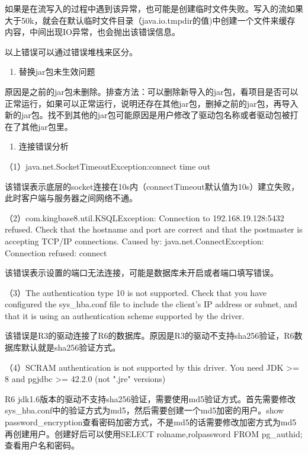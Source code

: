 \documentclass[letterpaper,10pt,english]{sphinxmanual}
\begin{document}
如果是在流写入的过程中遇到该异常，也可能是创建临时文件失败。写入的流如果大于50k，就会在默认临时文件目录（java.io.tmpdir的值)中创建一个文件来缓存内容，中间出现IO异常，也会抛出该错误信息。

以上错误可以通过错误堆栈来区分。
\begin{enumerate}
%
\setcounter{enumi}{5}
\item {} 
替换jar包未生效问题

\end{enumerate}

原因是之前的jar包未删除。排查方法：可以删除新导入的jar包，看项目是否可以正常运行，如果可以正常运行，说明还存在其他jar包，删掉之前的jar包，再导入新的jar包。找不到其他的jar包可能原因是用户修改了驱动包名称或者驱动包被打在了其他jar包里。
\begin{enumerate}
%
\setcounter{enumi}{6}
\item {} 
连接错误分析

\end{enumerate}

（1）java.net.SocketTimeoutException:connect time out

该错误表示底层的socket连接在10s内（connectTimeout默认值为10s）建立失败，此时客户端与服务器之间网络不通。

（2）com.kingbase8.util.KSQLException: Connection to 192.168.19.128:5432 refused. Check that the hostname and port are correct and that the postmaster is accepting TCP/IP connections.
Caused by: java.net.ConnectException: Connection refused: connect

该错误表示设置的端口无法连接，可能是数据库未开启或者端口填写错误。

（3）The authentication type 10 is not supported. Check that you have configured the sys\_hba.conf file to include the client's IP address or subnet, and that it is using an authentication scheme supported by the driver.

该错误是R3的驱动连接了R6的数据库。原因是R3的驱动不支持sha256验证，R6数据库默认就是sha256验证方式。

（4）SCRAM authentication is not supported by this driver. You need JDK >= 8 and pgjdbc >= 42.2.0 (not ".jre" versions)

R6 jdk1.6版本的驱动不支持sha256验证，需要使用md5验证方式。首先需要修改sys\_hba.conf中的验证方式为md5，然后需要创建一个md5加密的用户。show password\_encryption查看密码加密方式，不是md5的话需要修改加密方式为md5再创建用户。创建好后可以使用SELECT rolname,rolpassword FROM pg\_authid;查看用户名和密码。
\end{document}
